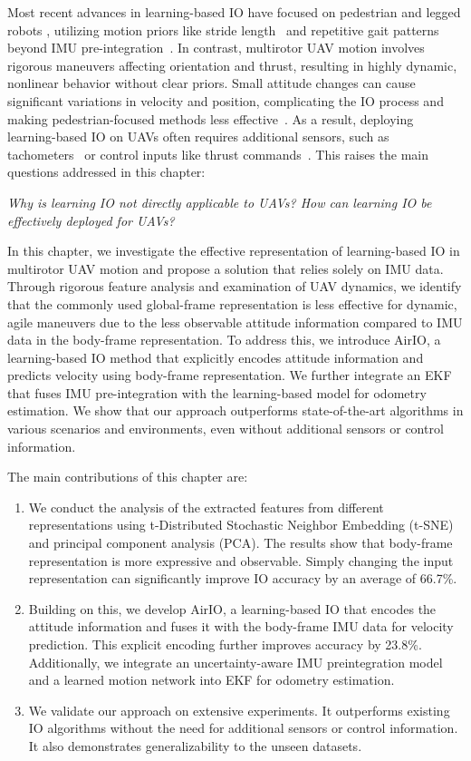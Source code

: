 Most recent advances in learning-based IO have focused on pedestrian and legged robots \cite{liu2020tlio, herath2020ronin, buchanan2022deep}, utilizing motion priors like stride length~\cite{yan2018ridi} and repetitive gait patterns~\cite{yang2023multi, teng2020arpdr} beyond IMU pre-integration~\cite{forster2015imu}.
In contrast, multirotor UAV motion involves rigorous maneuvers affecting orientation and thrust, resulting in highly dynamic, nonlinear behavior without clear priors.
Small attitude changes can cause significant variations in velocity and position, complicating the IO process and making pedestrian-focused methods less effective~\cite{CioffiRal2023}.
As a result, deploying learning-based IO on UAVs often requires additional sensors, such as tachometers~\cite{zhang2022dido} or control inputs like thrust commands~\cite{CioffiRal2023}.
This raises the main questions addressed in this chapter:

\textit{Why is learning IO not directly applicable to UAVs? How can learning IO be effectively deployed for UAVs?}

In this chapter, we investigate the effective representation of learning-based IO in multirotor UAV motion and propose a solution that relies solely on IMU data. Through rigorous feature analysis and examination of UAV dynamics, we identify that the commonly used global-frame representation is less effective for dynamic, agile maneuvers due to the less observable attitude information compared to IMU data in the body-frame representation. To address this, we introduce AirIO, a learning-based IO method that explicitly encodes attitude information and predicts velocity using body-frame representation. We further integrate an EKF that fuses IMU pre-integration with the learning-based model for odometry estimation.
We show that our approach outperforms state-of-the-art algorithms \cite{CioffiRal2023} in various scenarios and environments, even without additional sensors or control information.

The main contributions of this chapter are:
\begin{enumerate}
\item We conduct the analysis of the extracted features from different representations using t-Distributed Stochastic Neighbor Embedding (t-SNE) and principal component analysis (PCA). The results show that body-frame representation is more expressive and observable.
Simply changing the input representation can significantly improve IO accuracy by an average of 66.7\%.
\item Building on this, we develop AirIO, a learning-based IO that encodes the attitude information and fuses it with the body-frame IMU data for velocity prediction. This explicit encoding further improves accuracy by 23.8\%.
Additionally, we integrate an uncertainty-aware IMU preintegration model and a learned motion network into EKF for odometry estimation.
\item We validate our approach on extensive experiments. It outperforms existing IO algorithms without the need for additional sensors or control information. It also demonstrates generalizability to the unseen datasets.
\end{enumerate}


